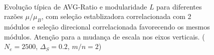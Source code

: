 \begin{center}
\begin{figure}[htbp]
      \\
      \vspace{-18pt}
      \vspace{11pt}
      \\
      \vspace{-18pt}
      \vspace{11pt}
      \\
      \caption{Evolução típica de AVG-Ratio e modularidade $L$ para diferentes razões 
      $\mu/\mu_B$, com seleção establizadora correlacionada com 2
      módulos e seleção direcional correlacionada favorecendo os mesmos
      módulos. Atenção para a mudança de escala nos eixos verticais. ($N_e=2500$, $\Delta_S=0.2$, $m/n=2$)}
      \label{DirecionalRMuStats}
   \end{figure}
\end{center}

